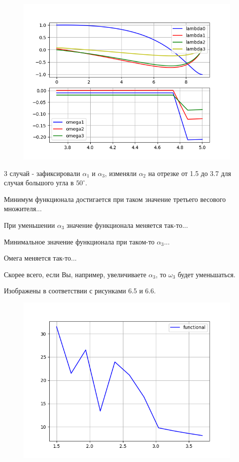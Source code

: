 \documentclass[14pt]{extreport}
\begin{document}
\begin{figure}[H]
\center\includegraphics[scale=0.8]{fig/ivp_and_control_3_7-5_5.png}
\caption{}
\end{figure}

3 случай - зафиксировали $\alpha_1$ и $\alpha_3$, изменяли $\alpha_2$ на отрезке от 1.5 до 3.7 для случая большого угла в $50^{\circ}$.

Минимум функционала достигается при таком значение третьего весового множителя...

При уменьшении $\alpha_3$ значение функционала меняется так-то...

Минимальное значение функционала при таком-то $\alpha_3$...

Омега меняется так-то...

Скорее всего, если Вы, например, увеличиваете $\alpha_3$, то $\omega_3$ будет уменьшаться.

Изображены в соответствии с рисунками 6.5 и 6.6.

\begin{figure}[H]
\center\includegraphics[scale=0.8]{fig/functional_alpha2_1_5-3_7_50.png}
\caption{}
\end{figure}
\end{document}
